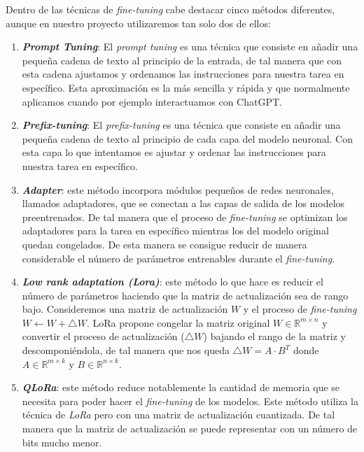 Dentro de las técnicas de \textit{fine-tuning} cabe destacar cinco métodos diferentes, aunque en
nuestro proyecto utilizaremos tan solo dos de ellos:

\begin{enumerate}
    \item \textit{\textbf{Prompt Tuning}}: El \textit{prompt tuning} es una técnica que consiste en
        añadir una pequeña cadena de texto al principio de la entrada, de tal manera que
        con esta cadena ajustamos y ordenamos las instrucciones para nuestra tarea en
        específico. Esta aproximación es la más sencilla y rápida y que normalmente aplicamos
        cuando por ejemplo interactuamos con ChatGPT.
    \item \textit{\textbf{Prefix-tuning}}: El \textit{prefix-tuning} es una técnica que consiste en
        añadir una pequeña cadena de texto al principio de cada capa del modelo neuronal.
        Con esta capa lo que intentamos es ajustar y ordenar las instrucciones para nuestra
        tarea en específico.
    \item \textit{\textbf{Adapter}}: este método incorpora módulos pequeños de redes neuronales,
        llamados adaptadores, que se conectan a las capas de salida de los modelos
        preentrenados. De tal manera que el proceso de \textit{fine-tuning} se optimizan los
        adaptadores para la tarea en específico mientras los del modelo original
        quedan congelados. De esta manera se consigue reducir de manera considerable
        el número de parámetros entrenables durante el \textit{fine-tuning}.
    \item \textit{\textbf{Low rank adaptation (Lora)}}: este método lo que hace es 
        reducir el número de parámetros haciendo que la matriz de actualización sea de rango bajo.
        Consideremos una matriz de actualización $W$ y el proceso de \textit{fine-tuning}
        $W\leftarrow W + \bigtriangleup W$. LoRa propone congelar la matriz original
        $W\in \mathbb{R}^{m\times n}$ y convertir el proceso de actualización ($\bigtriangleup W$)
        bajando el rango de la matriz y descomponiéndola, de tal manera que nos queda
        $\bigtriangleup W = A\cdot B^T$ donde $A\in \mathbb{R}^{m\times k}$ y $B\in \mathbb{R}^{n\times k}$.
        \cite{ZhaoWayneXin2023ASoL}
    \item \textit{\textbf{QLoRa}}: este método reduce notablemente la cantidad de memoria
        que se necesita para poder hacer el \textit{fine-tuning} de los modelos. Este método
        utiliza la técnica de \textit{LoRa} pero con una matriz de actualización cuantizada. De tal
        manera que la matriz de actualización se puede representar con un número de bits
        mucho menor.\cite{DettmersTim2023QEFo}
\end{enumerate}


